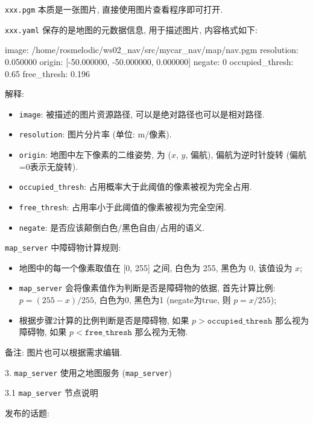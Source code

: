 \documentclass[openany, fontset=windowsold]{ctexbook}
\theoremstyle{kaiti}
\theoremstyle{normal}
\begin{document}
\verb|xxx.pgm| 本质是一张图片, 直接使用图片查看程序即可打开.

\verb|xxx.yaml| 保存的是地图的元数据信息, 用于描述图片, 内容格式如下:

\begin{bash}
  image: /home/rosmelodic/ws02_nav/src/mycar_nav/map/nav.pgm
  resolution: 0.050000
  origin: [-50.000000, -50.000000, 0.000000]
  negate: 0
  occupied_thresh: 0.65
  free_thresh: 0.196
\end{bash}

解释:

\begin{itemize}
  \item \verb|image|: 被描述的图片资源路径, 可以是绝对路径也可以是相对路径.

  \item \verb|resolution|: 图片分片率 (单位: m/像素).

  \item \verb|origin|: 地图中左下像素的二维姿势, 为 ($x$, $y$, 偏航), 偏航为逆时针旋转 (偏航=0表示无旋转).

  \item \verb|occupied_thresh|: 占用概率大于此阈值的像素被视为完全占用.

  \item \verb|free_thresh|: 占用率小于此阈值的像素被视为完全空闲.

  \item \verb|negate|: 是否应该颠倒白色/黑色自由/占用的语义.
\end{itemize}

\verb|map_server| 中障碍物计算规则:

\begin{itemize}
  \item 地图中的每一个像素取值在 [0, 255] 之间, 白色为 255, 黑色为 0, 该值设为 $x$; 
  \item \verb|map_server| 会将像素值作为判断是否是障碍物的依据, 首先计算比例: $p = (255 - x) / 255$, 白色为0, 黑色为1 (negate为true, 则 $p = x / 255$); 
  \item 根据步骤2计算的比例判断是否是障碍物, 如果 $p > \texttt{occupied\_thresh}$ 那么视为障碍物, 如果 $p < \texttt{free\_thresh}$ 那么视为无物.
\end{itemize}

备注: 图片也可以根据需求编辑.

3. \verb|map_server| 使用之地图服务 (\verb|map_server|)

3.1 \verb|map_server| 节点说明

发布的话题:
\end{document}
